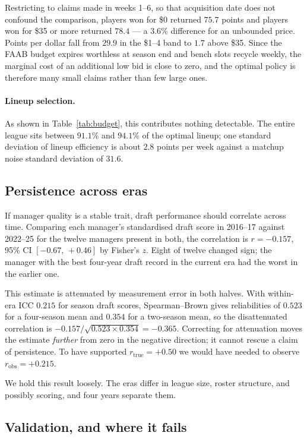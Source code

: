 \documentclass[11pt]{article}
\begin{document}
Restricting to claims made in weeks 1--6, so that acquisition date does not
confound the comparison, players won for \$0 returned $75.7$ points and players
won for \$35 or more returned $78.4$ --- a $3.6\%$ difference for an unbounded
price. Points per dollar fall from $29.9$ in the \$1--4 band to $1.7$ above \$35.
Since the FAAB budget expires worthless at season end and bench slots recycle
weekly, the marginal cost of an additional low bid is close to zero, and the
optimal policy is therefore many small claims rather than few large ones.

\paragraph{Lineup selection.} As shown in Table~\ref{tab:budget}, this
contributes nothing detectable. The entire league sits between $91.1\%$ and
$94.1\%$ of the optimal lineup; one standard deviation of lineup efficiency is
about $2.8$ points per week against a matchup noise standard deviation of $31.6$.

\subsection{Persistence across eras}\label{sec:persistence}

If manager quality is a stable trait, draft performance should correlate across
time. Comparing each manager's standardised draft score in 2016--17 against
2022--25 for the twelve managers present in both, the correlation is
$r = -0.157$, 95\% CI $[-0.67,\,+0.46]$ by Fisher's $z$. Eight of twelve changed
sign; the manager with the best four-year draft record in the current era had
the worst in the earlier one.

This estimate is attenuated by measurement error in both halves. With
within-era ICC $0.215$ for season draft scores, Spearman--Brown gives
reliabilities of $0.523$ for a four-season mean and $0.354$ for a two-season
mean, so the disattenuated correlation is
$-0.157 / \sqrt{0.523 \times 0.354} = -0.365$. Correcting for attenuation moves
the estimate \emph{further} from zero in the negative direction; it cannot
rescue a claim of persistence. To have supported $r_{\text{true}} = +0.50$ we
would have needed to observe $r_{\text{obs}} = +0.215$.

We hold this result loosely. The eras differ in league size, roster structure,
and possibly scoring, and four years separate them.

\subsection{Validation, and where it fails}\label{sec:validation}
\end{document}
